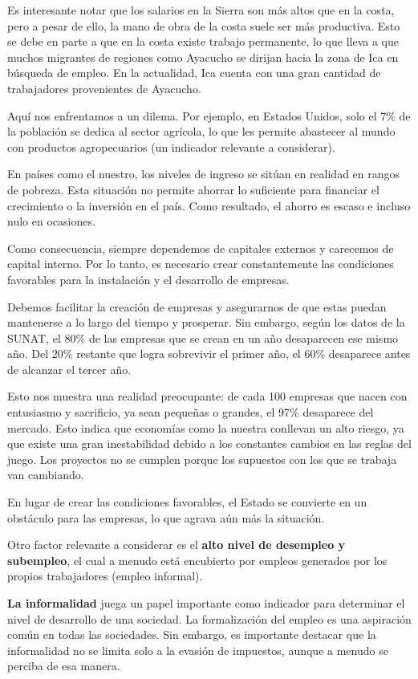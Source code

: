 \documentclass[
  letterpaper,
  DIV=11,
  numbers=noendperiod]{scrartcl}
\begin{document}
Es interesante notar que los salarios en la Sierra son más altos que en
la costa, pero a pesar de ello, la mano de obra de la costa suele ser
más productiva. Esto se debe en parte a que en la costa existe trabajo
permanente, lo que lleva a que muchos migrantes de regiones como
Ayacucho se dirijan hacia la zona de Ica en búsqueda de empleo. En la
actualidad, Ica cuenta con una gran cantidad de trabajadores
provenientes de Ayacucho.

Aquí nos enfrentamos a un dilema. Por ejemplo, en Estados Unidos, solo
el 7\% de la población se dedica al sector agrícola, lo que les permite
abastecer al mundo con productos agropecuarios (un indicador relevante a
considerar).

En países como el nuestro, los niveles de ingreso se sitúan en realidad
en rangos de pobreza. Esta situación no permite ahorrar lo suficiente
para financiar el crecimiento o la inversión en el país. Como resultado,
el ahorro es escaso e incluso nulo en ocasiones.

Como consecuencia, siempre dependemos de capitales externos y carecemos
de capital interno. Por lo tanto, es necesario crear constantemente las
condiciones favorables para la instalación y el desarrollo de empresas.

Debemos facilitar la creación de empresas y asegurarnos de que estas
puedan mantenerse a lo largo del tiempo y prosperar. Sin embargo, según
los datos de la SUNAT, el 80\% de las empresas que se crean en un año
desaparecen ese mismo año. Del 20\% restante que logra sobrevivir el
primer año, el 60\% desaparece antes de alcanzar el tercer año.

Esto nos muestra una realidad preocupante: de cada 100 empresas que
nacen con entusiasmo y sacrificio, ya sean pequeñas o grandes, el 97\%
desaparece del mercado. Esto indica que economías como la nuestra
conllevan un alto riesgo, ya que existe una gran inestabilidad debido a
los constantes cambios en las reglas del juego. Los proyectos no se
cumplen porque los supuestos con los que se trabaja van cambiando.

En lugar de crear las condiciones favorables, el Estado se convierte en
un obstáculo para las empresas, lo que agrava aún más la situación.

Otro factor relevante a considerar es el \textbf{alto nivel de desempleo
y subempleo}, el cual a menudo está encubierto por empleos generados por
los propios trabajadores (empleo informal).

\textbf{La informalidad} juega un papel importante como indicador para
determinar el nivel de desarrollo de una sociedad. La formalización del
empleo es una aspiración común en todas las sociedades. Sin embargo, es
importante destacar que la informalidad no se limita solo a la evasión
de impuestos, aunque a menudo se perciba de esa manera.
\end{document}
